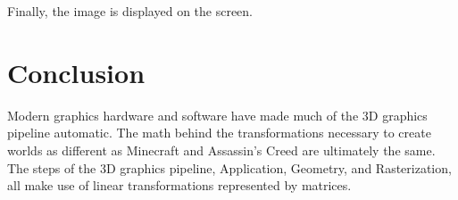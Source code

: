 \documentclass{article}
\begin{document}
Finally, the image is displayed on the screen.

\section{Conclusion}
Modern graphics hardware and software have made much of the 3D graphics pipeline automatic. The math behind the transformations necessary to create worlds as different as Minecraft and Assassin's Creed are ultimately the same. The steps of the 3D graphics pipeline, Application, Geometry, and Rasterization, all make use of linear transformations represented by matrices.
\end{document}
